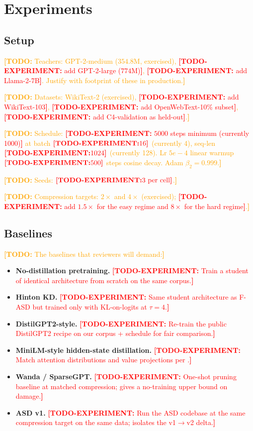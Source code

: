 \documentclass{article}
\newcommand{\todo}[1]{\textcolor{orange}{\textbf{[TODO:} #1\textbf{]}}}
\newcommand{\todoexp}[1]{\textcolor{red}{\textbf{[TODO-EXPERIMENT:} #1\textbf{]}}}
\newcommand{\fasd}{\texorpdfstring{\textsc{F-ASD}}{F-ASD}}
\begin{document}
\section{Experiments}
\label{sec:exp}

\subsection{Setup}
\label{sec:exp:setup}

\todo{Teachers: GPT-2-medium ($354.8$M, exercised),
\todoexp{add GPT-2-large ($774$M)}, \todoexp{add Llama-2-7B}.
Justify with footprint of these in production.}

\todo{Datasets: WikiText-2 (exercised), \todoexp{add WikiText-103},
\todoexp{add OpenWebText-10\% subset}, \todoexp{add C4-validation as held-out}.}

\todo{Schedule: \todoexp{$5000$ steps minimum (currently 1000)} at batch
$\todoexp{16}$ (currently 4), seq-len $\todoexp{1024}$ (currently 128). Lr $5e\!-\!4$
linear warmup $\todoexp{500}$ steps cosine decay. Adam $\beta_2 = 0.999$.}

\todo{Seeds: $\todoexp{3 \text{ per cell}}$.}

\todo{Compression targets: $2\times$ and $4\times$ (exercised);
\todoexp{add $1.5\times$ for the easy regime and $8\times$ for the hard
regime}.}

\subsection{Baselines}
\label{sec:exp:baselines}
\todo{The baselines that reviewers will demand:}
\begin{itemize}[leftmargin=*,nosep]
  \item \textbf{No-distillation pretraining.} \todoexp{Train a student of
        identical architecture from scratch on the same corpus.}
  \item \textbf{Hinton KD.} \todoexp{Same student architecture as \fasd{} but
        trained only with KL-on-logits at $\tau=4$.}
  \item \textbf{DistilGPT2-style.} \todoexp{Re-train the public DistilGPT2
        recipe on our corpus + schedule for fair comparison.}
  \item \textbf{MiniLM-style hidden-state distillation.} \todoexp{Match
        attention distributions and value projections per
        \citet{Wang2020MiniLM}.}
  \item \textbf{Wanda / SparseGPT.} \todoexp{One-shot pruning baseline at
        matched compression; gives a no-training upper bound on damage.}
  \item \textbf{ASD v1.} \todoexp{Run the ASD codebase at the same
        compression target on the same data; isolates the v1$\to$v2 delta.}
\end{itemize}
\end{document}

